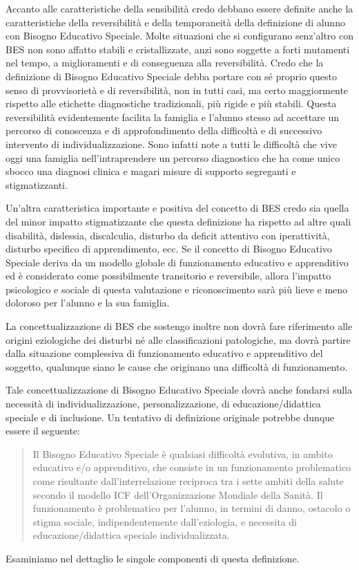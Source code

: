 Accanto alle caratteristiche della sensibilità credo debbano essere definite anche la
caratteristiche della reversibilità e della temporaneità della definizione di alunno con Bisogno
Educativo Speciale. Molte situazioni che si configurano senz'altro con BES non sono affatto stabili e
cristallizzate, anzi sono soggette a forti mutamenti nel tempo, a miglioramenti e di conseguenza
alla reversibilità. Credo che la definizione di Bisogno Educativo Speciale debba portare con sé
proprio questo senso di provvisorietà e di reversibilità, non in tutti casi, ma certo maggiormente
rispetto alle etichette diagnostiche tradizionali, più rigide e più stabili. Questa reversibilità
evidentemente facilita la famiglia e l'alunno stesso ad accettare un percorso di conoscenza e di
approfondimento della difficoltà e di successivo intervento di individualizzazione. Sono infatti note
a tutti le difficoltà che vive oggi una famiglia nell'intraprendere un percorso diagnostico che ha
come unico sbocco una diagnosi clinica e magari misure di supporto segreganti e stigmatizzanti.

Un'altra caratteristica importante e positiva del concetto di BES credo sia quella del minor
impatto stigmatizzante che questa definizione ha rispetto ad altre quali disabilità, dislessia,
discalculia, disturbo da deficit attentivo con iperattività, disturbo specifico di apprendimento, ecc.
Se il concetto di Bisogno Educativo Speciale deriva da un modello globale di funzionamento
educativo e apprenditivo ed è considerato come possibilmente transitorio e reversibile, allora
l'impatto psicologico e sociale di questa valutazione e riconoscimento sarà più lieve e meno
doloroso per l'alunno e la sua famiglia.

La concettualizzazione di BES che sostengo inoltre non dovrà fare riferimento alle origini
eziologiche dei disturbi né alle classificazioni patologiche, ma dovrà partire dalla situazione
complessiva di funzionamento educativo e apprenditivo del soggetto, qualunque siano le cause
che originano una difficoltà di funzionamento.

Tale concettualizzazione di Bisogno Educativo Speciale dovrà anche fondarsi sulla necessità di
individualizzazione, personalizzazione, di educazione/didattica speciale e di inclusione.
Un tentativo di definizione originale potrebbe dunque essere il seguente:
\begin{quote}
Il Bisogno Educativo Speciale è qualsiasi difficoltà evolutiva, in ambito educativo e/o
apprenditivo, che consiste in un funzionamento problematico come risultante
dall'interrelazione reciproca tra i sette ambiti della salute secondo il modello ICF
dell'Organizzazione Mondiale della Sanità. Il funzionamento è problematico per l'alunno,
in termini di danno, ostacolo o stigma sociale, indipendentemente dall'eziologia, e necessita di educazione/didattica speciale individualizzata.
\end{quote}
Esaminiamo nel dettaglio le singole componenti di questa definizione.


